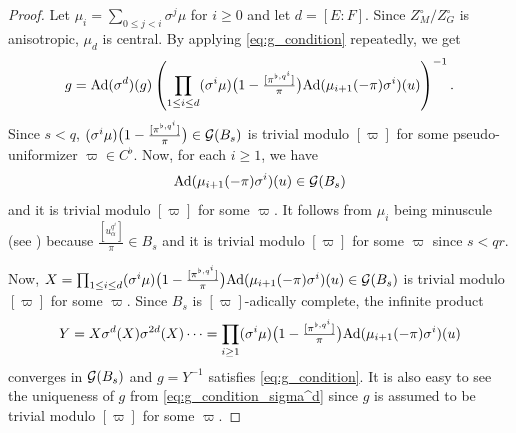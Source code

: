 \documentclass[12pt,reqno]{amsart}
\begin{document}
\begin{proof}
    Let $\mu_i = \sum_{0 \leq j < i} \sigma^j \mu$ for $i \geq 0$ and let $d = [E \colon F]$. Since $Z_M^\circ  / Z_G^\circ$ is anisotropic, $\mu_d$ is central. By applying \eqref{eq:g_condition} repeatedly, we get
    \begin{equation} \label{eq:g_condition_sigma^d}
        g = {\operatorname{Ad}}(\sigma^d)(g) \left(\prod_{1 \leq i \leq d} (\sigma^i\mu)\bigl(1 - \tfrac{[\pi^{\flat, q^{i}}]}{\pi}\bigr) {\operatorname{Ad}}(\mu_{i+1}(-\pi) \sigma^i)(u) \right)^{-1}. 
    \end{equation}
    Since $s < q$, $(\sigma^i\mu)\bigl(1 - \tfrac{[\pi^{\flat, q^{i}}]}{\pi}\bigr) \in {\mathcal{G}}(B_s)$ is trivial modulo $[\varpi]$ for some pseudo-uniformizer $\varpi \in C^\flat$. Now, for each $i \geq 1$, we have
    \[
        {\operatorname{Ad}}(\mu_{i + 1}(-\pi) \sigma^i)(u) \in {\mathcal{G}}(B_s)
    \]
    and it is trivial modulo $[\varpi]$ for some $\varpi$. It follows from $\mu_i$ being minuscule (see ) because $\tfrac{[u_\alpha^{q^i}]}{\pi} \in B_s$ and it is trivial modulo $[\varpi]$ for some $\varpi$ since $s < qr$. 

    Now, $X = \prod_{1 \leq i \leq d} (\sigma^i\mu)\bigl(1 - \tfrac{[\pi^{\flat, q^{i}}]}{\pi}\bigr) {\operatorname{Ad}}(\mu_{i+1}(-\pi) \sigma^i)(u) \in {\mathcal{G}}(B_s)$ is trivial modulo $[\varpi]$ for some $\varpi$. Since $B_s$ is $[\varpi]$-adically complete, the infinite product 
    \begin{equation} \label{eq:definition_Y}
        Y = X \sigma^d(X) \sigma^{2d}(X) \cdots = \prod_{i \geq 1} (\sigma^i\mu)\bigl(1 - \tfrac{[\pi^{\flat, q^{i}}]}{\pi}\bigr) {\operatorname{Ad}}(\mu_{i+1}(-\pi) \sigma^i)(u)
    \end{equation}
    converges in ${\mathcal{G}}(B_s)$ and $g = Y^{-1}$ satisfies \eqref{eq:g_condition}. It is also easy to see the uniqueness of $g$ from \eqref{eq:g_condition_sigma^d} since $g$ is assumed to be trivial modulo $[\varpi]$ for some $\varpi$. 
\end{proof}
\end{document}
